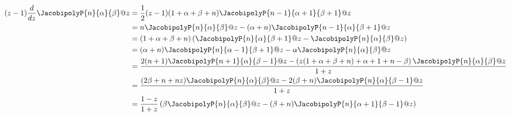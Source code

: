 \begin{align}
    (z-1) \frac{d}{dz} \JacobipolyP{n}{\alpha}{\beta}@{z} &= \frac{1}{2} (z-1)(1+\alpha+\beta+n)\JacobipolyP{n-1}{\alpha+1}{\beta+1}@{z} \\
    &= n \JacobipolyP{n}{\alpha}{\beta}@{z} - (\alpha+n) \JacobipolyP{n-1}{\alpha}{\beta+1}@{z} \\
    &=(1+\alpha+\beta+n) \left( \JacobipolyP{n}{\alpha}{\beta+1}@{z} - \JacobipolyP{n}{\alpha}{\beta}@{z} \right) \\
    &=(\alpha+n) \JacobipolyP{n}{\alpha-1}{\beta+1}@{z} - \alpha \JacobipolyP{n}{\alpha}{\beta}@{z} \\
    &=\frac{2(n+1) \JacobipolyP{n+1}{\alpha}{\beta-1}@{z} - \left(z(1+\alpha+\beta+n)+\alpha+1+n-\beta \right) \JacobipolyP{n}{\alpha}{\beta}@{z}}{1+z} \\
    &=\frac{(2\beta+n+nz) \JacobipolyP{n}{\alpha}{\beta}@{z} - 2(\beta+n) \JacobipolyP{n}{\alpha}{\beta-1}@{z}}{1+z} \\
    &=\frac{1-z}{1+z} \left( \beta \JacobipolyP{n}{\alpha}{\beta}@{z} - (\beta+n) \JacobipolyP{n}{\alpha+1}{\beta-1}@{z} \right)
\end{align}